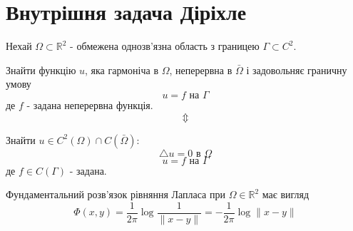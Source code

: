 \documentclass[12pt]{report}
\begin{document}
	\section{Внутрішня задача Діріхле}
	\hspace{0.8cm} Нехай $\Omega\subset\mathbb{R}^2$ - обмежена однозв'язна область з границею $\Gamma\subset C^2$.
	\par Знайти функцію $u$, яка гармоніча в $\Omega$, неперервна в $\bar{\Omega}$ і задовольняє граничну умову $$u=f \text{ на }\Gamma$$
	де $f$ - задана неперервна функція. $$\Updownarrow$$
	\par Знайти $u\in C^2(\Omega)\cap C(\bar{\Omega}):$
	$$\triangle u=0 \text{ в }\Omega$$
	$$u=f\text{ на }\Gamma$$
	де $f\in C(\Gamma)$ - задана.
	\par Фундаментальний розв'язок рівняння Лапласа при $\Omega\in\mathbb{R}^2$ має вигляд $$\Phi(x,y)=\frac{1}{2\pi}\log\frac{1}{\|x-y\|}=-\frac{1}{2\pi}\log\|x-y\|$$
	
\end{document}
